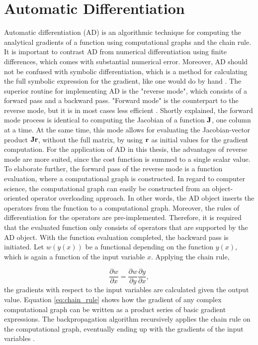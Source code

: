 

\section{Automatic Differentiation}\label{sec:theory_AD}
\noindent
Automatic differentiation (AD) is an algorithmic technique for computing the analytical gradients of a function using computational graphs and the chain rule.
It is important to contrast AD from numerical differentiation using finite differences, which comes with substantial numerical error.
Moreover, AD should not be confused with symbolic differentiation, which is a method for calculating the full symbolic expression for the gradient, like one would do by hand \cite{baydin2018automatic}.
The superior routine for implementing AD is the "reverse mode", which consists of a forward pass and a backward pass.
"Forward mode" is the counterpart to the reverse mode, but it is in most cases less efficient \cite{baydin2018automatic}.
Shortly explained, the forward mode process is identical to computing the Jacobian of a function $\bm{\mathrm{J}}$, one column at a time.
At the same time, this mode allows for evaluating the Jacobian-vector product $\bm{\mathrm{Jr}}$, without the full matrix, by using $\bm{\mathrm{r}}$ as initial values for the gradient computation.
For the application of AD in this thesis, the advantages of reverse mode are more suited, since the cost function is summed to a single scalar value.
To elaborate further, the forward pass of the reverse mode is a function evaluation, where a computational graph is constructed.
In regard to computer science, the computational graph can easily be constructed from an object-oriented operator overloading approach.
In other words, the AD object inserts the operators from the function to a computational graph.
Moreover, the rules of differentiation for the operators are pre-implemented.
Therefore, it is required that the evaluated function only consists of operators that are supported by the AD object.
With the function evaluation completed, the backward pass is initiated.
Let $w(y(x))$ be a functional depending on the function $y(x)$, which is again a function of the input variable $x$. Applying the chain rule,

\begin{equation}\label{eq:chain_rule}
    \frac{\partial w}{\partial x} = \frac{\partial w}{\partial y} \frac{\partial y}{\partial x},
\end{equation}
the gradients with respect to the input variables are calculated given the output value.
Equation \eqref{eq:chain_rule} shows how the gradient of any complex computational graph can be written as a product series of basic gradient expressions.
The backpropagation algorithm recursively applies the chain rule on the computational graph, eventually ending up with the gradients of the input variables \cite{baydin2018automatic}.

